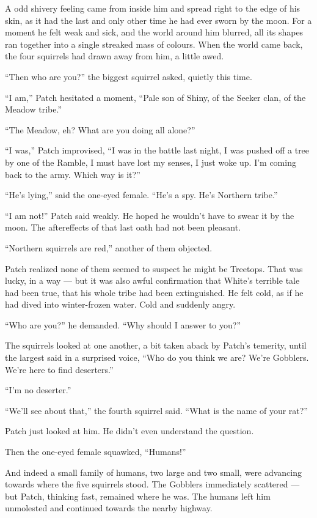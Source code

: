 \documentclass[ebook,oneside,openany,17pt]{memoir}
\newenvironment{tolerant}[1]{%
  \par\tolerance=#1\relax
}{%
  \par
}
\begin{document}
A odd shivery feeling came from inside him and spread right to the
edge of his skin, as it had the last and only other time he had ever
sworn by the moon. For a moment he felt weak and sick, and the world
around him blurred, all its shapes ran together into a single streaked
mass of colours. When the world came back, the four squirrels had
drawn away from him, a little awed.

“Then who are you?” the biggest squirrel asked, quietly this time.

“I am,” Patch hesitated a moment, “Pale son of Shiny, of the Seeker
clan, of the Meadow tribe.”

“The Meadow, eh? What are you doing all alone?”

“I was,” Patch improvised, “I was in the battle last night, I was
pushed off a tree by one of the Ramble, I must have lost my senses, I
just woke up. I’m coming back to the army. Which way is it?”

“He’s lying,” said the one-eyed female. “He’s a spy. He’s Northern
tribe.”

\begin{tolerant}{5000}
“I am not!” Patch said weakly. He hoped he wouldn’t have to swear it
by the moon. The aftereffects of that last oath had not been pleasant.
\end{tolerant}

“Northern squirrels are red,” another of them objected.

Patch realized none of them seemed to suspect he might be
Treetops. That was lucky, in a way — but it was also awful
confirmation that White’s terrible tale had been true, that his whole
tribe had been extinguished. He felt cold, as if he had dived into
winter-frozen water. Cold and suddenly angry.

“Who are you?” he demanded. “Why should I answer to you?”

The squirrels looked at one another, a bit taken aback by Patch’s
temerity, until the largest said in a surprised voice, “Who do you
think we are? We’re Gobblers. We’re here to find deserters.”

“I’m no deserter.”

“We’ll see about that,” the fourth squirrel said. “What is the name of
your rat?”

Patch just looked at him. He didn’t even understand the question.

Then the one-eyed female squawked, “Humans!”

And indeed a small family of humans, two large and two small, were
advancing towards where the five squirrels stood. The Gobblers
immediately scattered — but Patch, thinking fast, remained where he
was. The humans left him unmolested and continued towards the nearby
highway.
\end{document}
